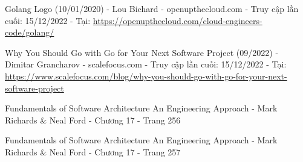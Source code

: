 \begin{thebibliography}{80}
    Golang Logo (10/01/2020) - Lou Bichard - openupthecloud.com - Truy cập lần cuối: 15/12/2022 - Tại: \url{https://openupthecloud.com/cloud-engineers-code/golang/}

    Why You Should Go with Go for Your Next Software Project (09/2022) - Dimitar Grancharov - scalefocus.com - Truy cập lần cuối: 15/12/2022 - Tại: \url{https://www.scalefocus.com/blog/why-you-should-go-with-go-for-your-next-software-project}

    Fundamentals of Software Architecture An Engineering Approach - Mark Richards \& Neal Ford - Chương 17 - Trang 256

    Fundamentals of Software Architecture An Engineering Approach - Mark Richards \& Neal Ford - Chương 17 - Trang 257



\end{thebibliography}